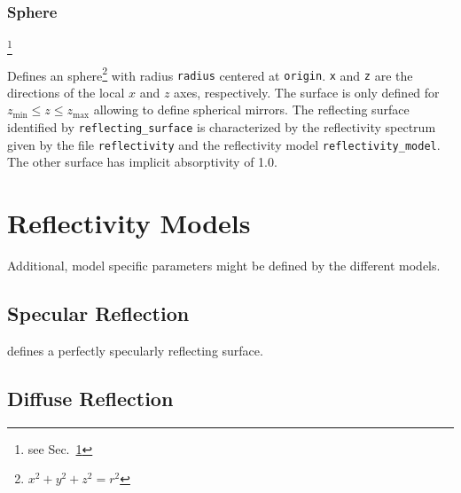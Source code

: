 \documentclass[10pt,a4paper,titlepage]{article}
\begin{document}
\subsubsection{Sphere}










\footnote{see Sec.~\ref{sec:refl_models}}


\vspace{0.25cm}
Defines an sphere\footnote{${x^2}+{y^2}+{z^2}={r^2}$} with radius {\tt radius} centered at {\tt origin}. {\tt x} and {\tt z} are the directions of the local $x$ and $z$ axes, respectively. The surface is only defined for $z_\mathrm{min} \leq z \leq z_\mathrm{max}$ allowing to define spherical mirrors. The reflecting surface identified by {\tt reflecting\_surface} is characterized by the reflectivity spectrum given by the file {\tt reflectivity} and the reflectivity model {\tt reflectivity\_model}. The other surface has implicit absorptivity of 1.0.



\section{Reflectivity Models} \label{sec:refl_models}

Additional, model specific parameters might be defined by the different models.

\subsection{Specular Reflection}

 defines a perfectly specularly reflecting surface.

\subsection{Diffuse Reflection}
\end{document}
